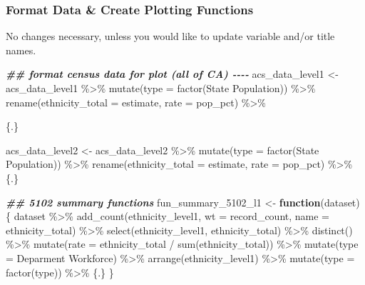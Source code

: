 \documentclass[
]{article}
\newenvironment{Shaded}{\begin{snugshade}}{\end{snugshade}}
\newcommand{\AttributeTok}[1]{\textcolor[rgb]{0.77,0.63,0.00}{#1}}
\newcommand{\ControlFlowTok}[1]{\textcolor[rgb]{0.13,0.29,0.53}{\textbf{#1}}}
\newcommand{\DocumentationTok}[1]{\textcolor[rgb]{0.56,0.35,0.01}{\textbf{\textit{#1}}}}
\newcommand{\FunctionTok}[1]{\textcolor[rgb]{0.00,0.00,0.00}{#1}}
\newcommand{\NormalTok}[1]{#1}
\newcommand{\OtherTok}[1]{\textcolor[rgb]{0.56,0.35,0.01}{#1}}
\newcommand{\SpecialCharTok}[1]{\textcolor[rgb]{0.00,0.00,0.00}{#1}}
\newcommand{\StringTok}[1]{\textcolor[rgb]{0.31,0.60,0.02}{#1}}
\begin{document}
\hypertarget{format-data-create-plotting-functions}{%
\subsubsection{Format Data \& Create Plotting
Functions}\label{format-data-create-plotting-functions}}

No changes necessary, unless you would like to update variable and/or
title names.

\begin{Shaded}
\begin{Highlighting}[]
\DocumentationTok{\#\# format census data for plot (all of CA) {-}{-}{-}{-}}
\NormalTok{acs\_data\_level1 }\OtherTok{\textless{}{-}}\NormalTok{ acs\_data\_level1 }\SpecialCharTok{\%\textgreater{}\%}
    \FunctionTok{mutate}\NormalTok{(}\AttributeTok{type =} \FunctionTok{factor}\NormalTok{(}\StringTok{\textquotesingle{}State Population\textquotesingle{}}\NormalTok{)) }\SpecialCharTok{\%\textgreater{}\%}
    \FunctionTok{rename}\NormalTok{(}\AttributeTok{ethnicity\_total =}\NormalTok{ estimate,}
           \AttributeTok{rate =}\NormalTok{ pop\_pct) }\SpecialCharTok{\%\textgreater{}\%}
    
\NormalTok{    \{.\}}

\NormalTok{acs\_data\_level2 }\OtherTok{\textless{}{-}}\NormalTok{ acs\_data\_level2 }\SpecialCharTok{\%\textgreater{}\%}
    \FunctionTok{mutate}\NormalTok{(}\AttributeTok{type =} \FunctionTok{factor}\NormalTok{(}\StringTok{\textquotesingle{}State Population\textquotesingle{}}\NormalTok{)) }\SpecialCharTok{\%\textgreater{}\%}
    \FunctionTok{rename}\NormalTok{(}\AttributeTok{ethnicity\_total =}\NormalTok{ estimate,}
           \AttributeTok{rate =}\NormalTok{ pop\_pct) }\SpecialCharTok{\%\textgreater{}\%}
\NormalTok{    \{.\}}

\DocumentationTok{\#\# 5102 summary functions}
\NormalTok{fun\_summary\_5102\_l1 }\OtherTok{\textless{}{-}} \ControlFlowTok{function}\NormalTok{(dataset) \{}
\NormalTok{    dataset }\SpecialCharTok{\%\textgreater{}\%}
        \FunctionTok{add\_count}\NormalTok{(ethnicity\_level1,}
                  \AttributeTok{wt =}\NormalTok{ record\_count,}
                  \AttributeTok{name =} \StringTok{\textquotesingle{}ethnicity\_total\textquotesingle{}}\NormalTok{) }\SpecialCharTok{\%\textgreater{}\%}
        \FunctionTok{select}\NormalTok{(ethnicity\_level1, ethnicity\_total) }\SpecialCharTok{\%\textgreater{}\%}
        \FunctionTok{distinct}\NormalTok{() }\SpecialCharTok{\%\textgreater{}\%}
        \FunctionTok{mutate}\NormalTok{(}\AttributeTok{rate =}\NormalTok{ ethnicity\_total }\SpecialCharTok{/} \FunctionTok{sum}\NormalTok{(ethnicity\_total)) }\SpecialCharTok{\%\textgreater{}\%}
        \FunctionTok{mutate}\NormalTok{(}\AttributeTok{type =} \StringTok{\textquotesingle{}Deparment Workforce\textquotesingle{}}\NormalTok{) }\SpecialCharTok{\%\textgreater{}\%}
        \FunctionTok{arrange}\NormalTok{(ethnicity\_level1) }\SpecialCharTok{\%\textgreater{}\%}
        \FunctionTok{mutate}\NormalTok{(}\AttributeTok{type =} \FunctionTok{factor}\NormalTok{(type)) }\SpecialCharTok{\%\textgreater{}\%} 
\NormalTok{        \{.\}}
\NormalTok{\}}


\end{Highlighting}
\end{Shaded}
\end{document}
